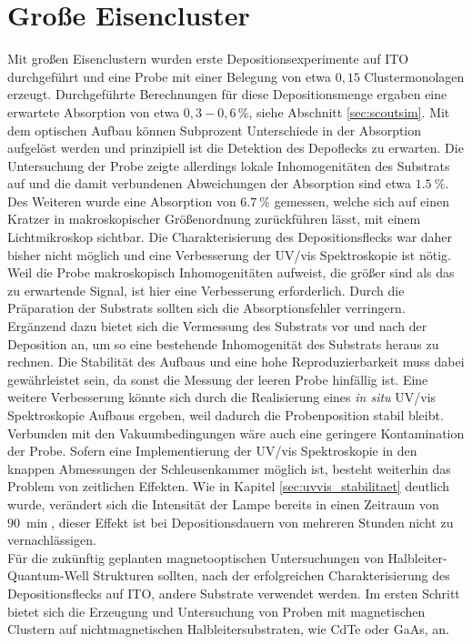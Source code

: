 \section{Große Eisencluster}
Mit großen Eisenclustern wurden erste Depositionsexperimente auf ITO durchgeführt und eine Probe mit einer Belegung von etwa $0,15$ Clustermonolagen erzeugt.
Durchgeführte Berechnungen für diese Depositionsmenge ergaben eine erwartete Absorption von etwa $0,3 - 0,6\,\%$, siehe Abschnitt \ref{sec:scoutsim}.
Mit dem optischen Aufbau können Subprozent Unterschiede in der Absorption aufgelöst werden und prinzipiell ist die Detektion des Depoflecks zu erwarten.
Die Untersuchung der Probe zeigte allerdings lokale Inhomogenitäten des Substrats auf und die damit verbundenen Abweichungen der Absorption sind etwa $\SI{1.5}{\%}$.
Des Weiteren wurde eine Absorption von $\SI{6.7}{\%}$ gemessen, welche sich auf einen Kratzer in makroskopischer Größenordnung zurückführen lässt, mit einem Lichtmikroskop sichtbar.
Die Charakterisierung des Depositionsflecks war daher bisher nicht möglich und eine Verbesserung der UV/vis Spektroskopie ist nötig.\\

Weil die Probe makroskopisch Inhomogenitäten aufweist, die größer sind als das zu erwartende Signal, ist hier eine Verbesserung erforderlich.
Durch die Präparation der Substrats sollten sich die Absorptionsfehler verringern.
Ergänzend dazu bietet sich die Vermessung des Substrats vor und nach der Deposition an, um so eine bestehende Inhomogenität des Substrats heraus zu rechnen.
Die Stabilität des Aufbaus und eine hohe Reproduzierbarkeit muss dabei gewährleistet sein, da sonst die Messung der leeren Probe hinfällig ist.
Eine weitere Verbesserung könnte sich durch die Realisierung eines \textit{in situ} UV/vis Spektroskopie Aufbaus ergeben, weil dadurch die Probenposition stabil bleibt.
Verbunden mit den Vakuumbedingungen wäre auch eine geringere Kontamination der Probe.
Sofern eine Implementierung der UV/vis Spektroskopie in den knappen Abmessungen der Schleusenkammer möglich ist, besteht weiterhin das Problem von zeitlichen Effekten.
Wie in Kapitel \ref{sec:uvvis_stabilitaet} deutlich wurde, verändert sich die Intensität der Lampe bereits in einen Zeitraum von $\SI{90}{\min}$, dieser Effekt ist bei Depositionsdauern von mehreren Stunden nicht zu vernachlässigen.\\

Für die zukünftig geplanten magnetooptischen Untersuchungen von Halbleiter-Quantum-Well Strukturen sollten, nach der erfolgreichen Charakterisierung des Depositionsflecks auf ITO, andere Substrate verwendet werden.
Im ersten Schritt bietet sich die Erzeugung und Untersuchung von Proben mit magnetischen Clustern auf nichtmagnetischen Halbleitersubstraten, wie CdTe oder GaAs, an.


